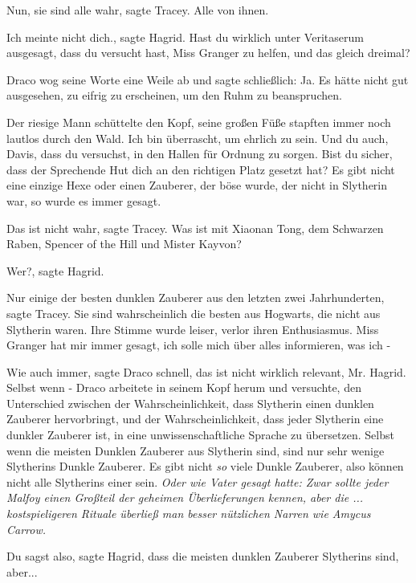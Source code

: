 \glqq{}Nun, sie sind alle wahr\grqq{}, sagte Tracey. \glqq{}Alle von ihnen.\grqq{}

\glqq{}Ich meinte nicht dich.\grqq{}, sagte Hagrid. \glqq{}Hast du wirklich unter
Veritaserum ausgesagt, dass du versucht hast, Miss Granger zu helfen, und
das gleich dreimal?\grqq{}

Draco wog seine Worte eine Weile ab und sagte schließlich: \glqq{}Ja.\grqq{} Es
hätte nicht gut ausgesehen, zu eifrig zu erscheinen, um den Ruhm zu
beanspruchen.

Der riesige Mann schüttelte den Kopf, seine großen Füße stapften immer noch
lautlos durch den Wald. \glqq{}Ich bin überrascht, um ehrlich zu sein. Und
du auch, Davis, dass du versuchst, in den Hallen für Ordnung zu sorgen.
Bist du sicher, dass der Sprechende Hut dich an den richtigen Platz
gesetzt hat? Es gibt nicht eine einzige Hexe oder einen Zauberer, der
böse wurde, der nicht in Slytherin war, so wurde es immer gesagt.\grqq{}

\glqq{}Das ist nicht wahr\grqq{}, sagte Tracey. \glqq{}Was ist mit Xiaonan Tong,
dem Schwarzen Raben, Spencer of the Hill und Mister Kayvon?\grqq{}

\glqq{}Wer?\grqq{}, sagte Hagrid.

\glqq{}Nur einige der besten dunklen Zauberer aus den letzten zwei
Jahrhunderten\grqq{}, sagte Tracey. \glqq{}Sie sind wahrscheinlich die
besten aus Hogwarts, die nicht aus Slytherin waren.\grqq{} Ihre Stimme
wurde leiser, verlor ihren Enthusiasmus. \glqq{}Miss Granger hat mir immer
gesagt, ich solle mich über alles informieren, was ich -\grqq{}

\glqq{}Wie auch immer\grqq{}, sagte Draco schnell, \glqq{}das ist nicht wirklich
relevant, Mr. Hagrid. Selbst wenn -\grqq{} Draco arbeitete in seinem Kopf
herum und versuchte, den Unterschied zwischen der Wahrscheinlichkeit,
dass Slytherin einen dunklen Zauberer hervorbringt, und der
Wahrscheinlichkeit, dass jeder Slytherin eine dunkler Zauberer ist, in
eine unwissenschaftliche Sprache zu übersetzen. \glqq{}Selbst wenn die
meisten Dunklen Zauberer aus Slytherin sind, sind nur sehr wenige
Slytherins Dunkle Zauberer. Es gibt nicht \emph{so} viele Dunkle
Zauberer, also können nicht alle Slytherins einer sein.\grqq{} \emph{Oder
wie Vater gesagt hatte: Zwar sollte jeder Malfoy einen Großteil der
geheimen Überlieferungen kennen, aber die ... kostspieligeren Rituale
überließ man besser nützlichen Narren wie Amycus Carrow.}

\glqq{}Du sagst also\grqq{}, sagte Hagrid, \glqq{}dass die meisten dunklen
Zauberer Slytherins sind, aber...\grqq{}

